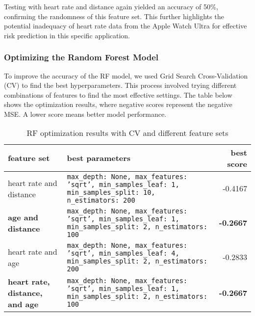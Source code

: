 Testing with heart rate and distance again yielded an accuracy of 50\%, confirming the randomness of this feature set. This further highlights the potential inadequacy of heart rate data from the Apple Watch Ultra for effective risk prediction in this specific application.

\subsubsection{Optimizing the Random Forest Model}

To improve the accuracy of the RF model, we used Grid Search Cross-Validation (CV) to find the best hyperparameters. This process involved trying different combinations of features to find the most effective settings. The table below shows the optimization results, where negative scores represent the negative MSE. A lower score means better model performance.

\FloatBarrier
\begin{table}[h!]
\centering
\label{tab:optimization_results}
\begin{tabular}{>{\raggedright\arraybackslash}p{3.5cm} >{\raggedright\arraybackslash}p{6cm} r}
\toprule
\textbf{feature set} & \textbf{best parameters} & \textbf{best score} \\
\midrule
heart rate and distance & \texttt{max\_depth: None, max\_features: 'sqrt', min\_samples\_leaf: 1, min\_samples\_split: 10, n\_estimators: 200} & -0.4167 \\
\addlinespace
\textbf{age and distance} & \texttt{max\_depth: None, max\_features: 'sqrt', min\_samples\_leaf: 1, min\_samples\_split: 2, n\_estimators: 100} & \textbf{-0.2667} \\
\addlinespace
heart rate and age & \texttt{max\_depth: None, max\_features: 'sqrt', min\_samples\_leaf: 4, min\_samples\_split: 2, n\_estimators: 200} & -0.2833 \\
\addlinespace
\textbf{heart rate, distance, and age} & \texttt{max\_depth: None, max\_features: 'sqrt', min\_samples\_leaf: 1, min\_samples\_split: 2, n\_estimators: 100} & \textbf{-0.2667} \\
\bottomrule
\end{tabular}
\caption{RF optimization results with CV and different feature sets}
\label{table:RFoptiCV}
\end{table}
\FloatBarrier

